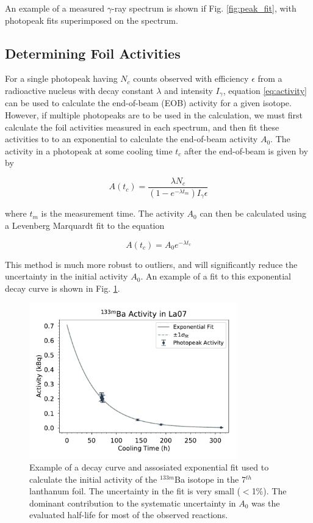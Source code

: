 \documentclass[aps,superscriptaddress,twocolumn,secnumarabic,balancelastpage,amsmath,amssymb,nofootinbib,floatfix]{revtex4-1}
\begin{document}
An example of a measured $\gamma$-ray spectrum is shown if Fig. \ref{fig:peak_fit}, with photopeak fits superimposed on the spectrum.

\subsection{Determining Foil Activities}
\label{eob_activities}

For a single photopeak having $N_c$ counts observed with efficiency $\epsilon$ from a radioactive nucleus with decay constant $\lambda$ and intensity $I_{\gamma}$, equation \ref{eq:activity} can be used to calculate the end-of-beam (EOB) activity for a given isotope.  However, if multiple photopeaks are to be used in the calculation, we must first calculate the foil activities measured in each spectrum, and then fit these activities to to an exponential to calculate the end-of-beam activity $A_0$. The activity in a photopeak at some cooling time $t_c$ after the end-of-beam is given by by

\begin{equation}
A(t_c) = \frac{\lambda N_c}{(1-e^{-\lambda t_m})I_{\gamma}\epsilon}
\end{equation}

where $t_m$ is the measurement time.  The activity $A_0$ can then be calculated using a Levenberg Marquardt fit to the equation

\begin{equation}
A(t_c) = A_0e^{-\lambda t_c}
\label{eq:decay}
\end{equation}

This method is much more robust to outliers, and will significantly reduce the uncertainty in the initial activity $A_0$.  An example of a fit to this exponential decay curve is shown in Fig. \ref{fig:decay_curves}.

\begin{figure}[htb]
\includegraphics[width=9cm]{decay_curves/La07_133BAm}
\caption{Example of a decay curve and assosiated exponential fit used to calculate the initial activity of the $^{133m}$Ba isotope in the 7$^{th}$ lanthanum foil.  The uncertainty in the fit is very small ($<$1\%). The dominant contribution to the systematic uncertainty in $A_0$ was the evaluated half-life for most of the observed reactions.
}
\label{fig:decay_curves}
\end{figure}
\end{document}
